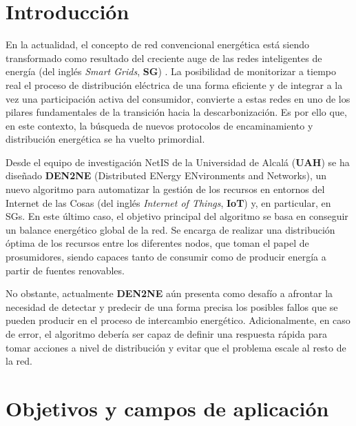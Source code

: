 \newpage
\section{Introducción}
\vspace{0.3cm}

En la actualidad, el concepto de red convencional energética está siendo transformado como resultado del creciente auge de las redes inteligentes de energía (del inglés \textit{Smart Grids}, \textbf{SG}) \cite{repsol}\cite{impact}. La posibilidad de monitorizar a tiempo real el proceso de distribución eléctrica de una forma eficiente y de integrar a la vez una participación activa del consumidor, convierte a estas redes en uno de los pilares fundamentales de la transición hacia la descarbonización. Es por ello que, en este contexto, la búsqueda de nuevos protocolos de encaminamiento y distribución energética se ha vuelto primordial. 

\vspace{0.3cm}

Desde el equipo de investigación NetIS de la Universidad de Alcalá (\textbf{UAH}) se ha diseñado \textbf{DEN2NE} (Distributed ENergy ENvironments and Networks), un nuevo algoritmo para automatizar la gestión de los recursos en entornos del Internet de las Cosas (del inglés \textit{Internet of Things}, \textbf{IoT}) y, en particular, en SGs. En este último caso, el objetivo principal del algoritmo se basa en conseguir un balance energético global de la red. Se encarga de realizar una distribución óptima de los recursos entre los diferentes nodos, que toman el papel de prosumidores, siendo capaces tanto de consumir como de producir energía a partir de fuentes renovables.

\vspace{0.3cm}

No obstante, actualmente \textbf{DEN2NE} aún presenta como desafío a afrontar la necesidad de detectar y predecir de una forma precisa los posibles fallos que se pueden producir en el proceso de intercambio energético. Adicionalmente, en caso de error, el algoritmo debería ser capaz de definir una respuesta rápida para tomar acciones a nivel de distribución y evitar que el problema escale al resto de la red.

\vspace{0.3cm}

\section{Objetivos y campos de aplicación}
\vspace{0.3cm}

